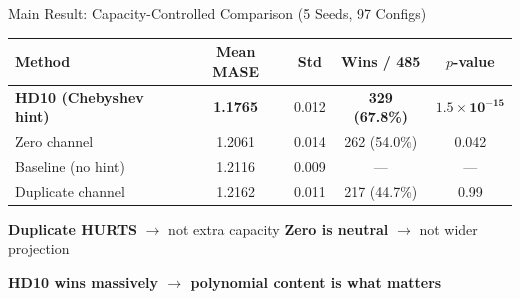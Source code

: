 \documentclass[aspectratio=169,11pt]{beamer}
\begin{document}
\begin{frame}{Main Result: Capacity-Controlled Comparison (5 Seeds, 97 Configs)}

\begin{table}
\centering
\footnotesize
\begin{tabular}{lcccc}
\toprule
\textbf{Method} & \textbf{Mean MASE} & \textbf{Std} & \textbf{Wins / 485} & \textbf{$p$-value} \\
\midrule
\textcolor{improve}{\textbf{HD10 (Chebyshev hint)}} & \textcolor{improve}{\textbf{1.1765}} & 0.012 & \textcolor{improve}{\textbf{329 (67.8\%)}} & $\mathbf{1.5 \times 10^{-15}}$ \\
Zero channel & 1.2061 & 0.014 & 262 (54.0\%) & 0.042 \\
Baseline (no hint) & 1.2116 & 0.009 & --- & --- \\
\textcolor{worsen}{Duplicate channel} & \textcolor{worsen}{1.2162} & 0.011 & \textcolor{worsen}{217 (44.7\%)} & 0.99 \\
\bottomrule
\end{tabular}
\end{table}

\medskip

\begin{center}
\textbf{Duplicate HURTS} $\rightarrow$ not extra capacity \qquad
\textbf{Zero is neutral} $\rightarrow$ not wider projection

\medskip
\textcolor{improve}{\textbf{HD10 wins massively $\rightarrow$ polynomial content is what matters}}
\end{center}

\end{frame}
\end{document}
